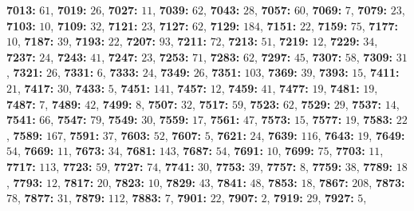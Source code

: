 \textsf{\bfseries 7013:} $61$, \textsf{\bfseries 7019:} $26$, \textsf{\bfseries 7027:} $11$, \textsf{\bfseries 7039:} $62$, \textsf{\bfseries 7043:} $28$, \textsf{\bfseries 7057:} $60$, \textsf{\bfseries 7069:} $7$, \textsf{\bfseries 7079:} $23$, \textsf{\bfseries 7103:} $10$, \textsf{\bfseries 7109:} $32$, \textsf{\bfseries 7121:} $23$, \textsf{\bfseries 7127:} $62$, \textsf{\bfseries 7129:} $184$, \textsf{\bfseries 7151:} $22$, \textsf{\bfseries 7159:} $75$, \textsf{\bfseries 7177:} $10$, \textsf{\bfseries 7187:} $39$, \textsf{\bfseries 7193:} $22$, \textsf{\bfseries 7207:} $93$, \textsf{\bfseries 7211:} $72$, \textsf{\bfseries 7213:} $51$, \textsf{\bfseries 7219:} $12$, \textsf{\bfseries 7229:} $34$, \textsf{\bfseries 7237:} $24$, \textsf{\bfseries 7243:} $41$, \textsf{\bfseries 7247:} $23$, \textsf{\bfseries 7253:} $71$, \textsf{\bfseries 7283:} $62$, \textsf{\bfseries 7297:} $45$, \textsf{\bfseries 7307:} $58$, \textsf{\bfseries 7309:} $31$, \textsf{\bfseries 7321:} $26$, \textsf{\bfseries 7331:} $6$, \textsf{\bfseries 7333:} $24$, \textsf{\bfseries 7349:} $26$, \textsf{\bfseries 7351:} $103$, \textsf{\bfseries 7369:} $39$, \textsf{\bfseries 7393:} $15$, \textsf{\bfseries 7411:} $21$, \textsf{\bfseries 7417:} $30$, \textsf{\bfseries 7433:} $5$, \textsf{\bfseries 7451:} $141$, \textsf{\bfseries 7457:} $12$, \textsf{\bfseries 7459:} $41$, \textsf{\bfseries 7477:} $19$, \textsf{\bfseries 7481:} $19$, \textsf{\bfseries 7487:} $7$, \textsf{\bfseries 7489:} $42$, \textsf{\bfseries 7499:} $8$, \textsf{\bfseries 7507:} $32$, \textsf{\bfseries 7517:} $59$, \textsf{\bfseries 7523:} $62$, \textsf{\bfseries 7529:} $29$, \textsf{\bfseries 7537:} $14$, \textsf{\bfseries 7541:} $66$, \textsf{\bfseries 7547:} $79$, \textsf{\bfseries 7549:} $30$, \textsf{\bfseries 7559:} $17$, \textsf{\bfseries 7561:} $47$, \textsf{\bfseries 7573:} $15$, \textsf{\bfseries 7577:} $19$, \textsf{\bfseries 7583:} $22$, \textsf{\bfseries 7589:} $167$, \textsf{\bfseries 7591:} $37$, \textsf{\bfseries 7603:} $52$, \textsf{\bfseries 7607:} $5$, \textsf{\bfseries 7621:} $24$, \textsf{\bfseries 7639:} $116$, \textsf{\bfseries 7643:} $19$, \textsf{\bfseries 7649:} $54$, \textsf{\bfseries 7669:} $11$, \textsf{\bfseries 7673:} $34$, \textsf{\bfseries 7681:} $143$, \textsf{\bfseries 7687:} $54$, \textsf{\bfseries 7691:} $10$, \textsf{\bfseries 7699:} $75$, \textsf{\bfseries 7703:} $11$, \textsf{\bfseries 7717:} $113$, \textsf{\bfseries 7723:} $59$, \textsf{\bfseries 7727:} $74$, \textsf{\bfseries 7741:} $30$, \textsf{\bfseries 7753:} $39$, \textsf{\bfseries 7757:} $8$, \textsf{\bfseries 7759:} $38$, \textsf{\bfseries 7789:} $18$, \textsf{\bfseries 7793:} $12$, \textsf{\bfseries 7817:} $20$, \textsf{\bfseries 7823:} $10$, \textsf{\bfseries 7829:} $43$, \textsf{\bfseries 7841:} $48$, \textsf{\bfseries 7853:} $18$, \textsf{\bfseries 7867:} $208$, \textsf{\bfseries 7873:} $78$, \textsf{\bfseries 7877:} $31$, \textsf{\bfseries 7879:} $112$, \textsf{\bfseries 7883:} $7$, \textsf{\bfseries 7901:} $22$, \textsf{\bfseries 7907:} $2$, \textsf{\bfseries 7919:} $29$, \textsf{\bfseries 7927:} $5$, 
